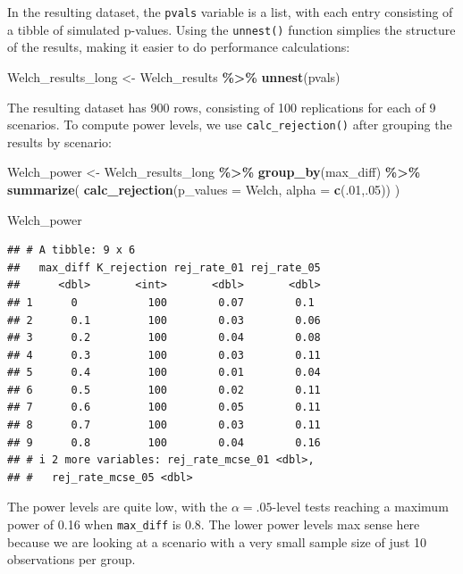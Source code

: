 \documentclass[
]{book}
\newenvironment{Shaded}{\begin{snugshade}}{\end{snugshade}}
\newcommand{\AttributeTok}[1]{\textcolor[rgb]{0.13,0.29,0.53}{#1}}
\newcommand{\DecValTok}[1]{\textcolor[rgb]{0.00,0.00,0.81}{#1}}
\newcommand{\FunctionTok}[1]{\textcolor[rgb]{0.13,0.29,0.53}{\textbf{#1}}}
\newcommand{\NormalTok}[1]{#1}
\newcommand{\OtherTok}[1]{\textcolor[rgb]{0.56,0.35,0.01}{#1}}
\newcommand{\SpecialCharTok}[1]{\textcolor[rgb]{0.81,0.36,0.00}{\textbf{#1}}}
\begin{document}
In the resulting dataset, the \texttt{pvals} variable is a list, with each entry consisting of a tibble of simulated p-values.
Using the \texttt{unnest()} function simplies the structure of the results, making it easier to do performance calculations:

\begin{Shaded}
\begin{Highlighting}[]
\NormalTok{Welch\_results\_long }\OtherTok{\textless{}{-}}\NormalTok{ Welch\_results }\SpecialCharTok{\%\textgreater{}\%} \FunctionTok{unnest}\NormalTok{(pvals)}
\end{Highlighting}
\end{Shaded}

The resulting dataset has 900 rows, consisting of 100 replications for each of 9 scenarios.
To compute power levels, we use \texttt{calc\_rejection()} after grouping the results by scenario:

\begin{Shaded}
\begin{Highlighting}[]
\NormalTok{Welch\_power }\OtherTok{\textless{}{-}} 
\NormalTok{  Welch\_results\_long }\SpecialCharTok{\%\textgreater{}\%} 
  \FunctionTok{group\_by}\NormalTok{(max\_diff) }\SpecialCharTok{\%\textgreater{}\%}
  \FunctionTok{summarize}\NormalTok{(}
    \FunctionTok{calc\_rejection}\NormalTok{(}\AttributeTok{p\_values =}\NormalTok{ Welch, }\AttributeTok{alpha =} \FunctionTok{c}\NormalTok{(.}\DecValTok{01}\NormalTok{,.}\DecValTok{05}\NormalTok{))}
\NormalTok{  )}

\NormalTok{Welch\_power}
\end{Highlighting}
\end{Shaded}

\begin{verbatim}
## # A tibble: 9 x 6
##   max_diff K_rejection rej_rate_01 rej_rate_05
##      <dbl>       <int>       <dbl>       <dbl>
## 1      0           100        0.07        0.1 
## 2      0.1         100        0.03        0.06
## 3      0.2         100        0.04        0.08
## 4      0.3         100        0.03        0.11
## 5      0.4         100        0.01        0.04
## 6      0.5         100        0.02        0.11
## 7      0.6         100        0.05        0.11
## 8      0.7         100        0.03        0.11
## 9      0.8         100        0.04        0.16
## # i 2 more variables: rej_rate_mcse_01 <dbl>,
## #   rej_rate_mcse_05 <dbl>
\end{verbatim}

The power levels are quite low, with the \(\alpha = .05\)-level tests reaching a maximum power of 0.16 when \texttt{max\_diff} is 0.8.
The lower power levels max sense here because we are looking at a scenario with a very small sample size of just 10 observations per group.
\end{document}
